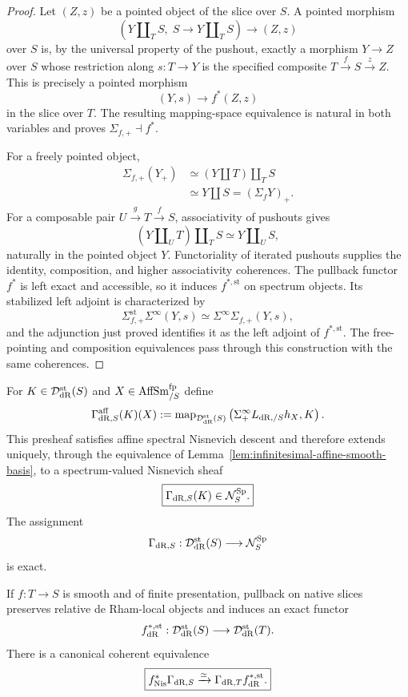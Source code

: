 \begin{proof}
Let $(Z,z)$ be a pointed object of the slice over $S$.  A pointed morphism
\[
    \left(Y\amalg_TS,\;S\to Y\amalg_TS\right)
    \longrightarrow
    (Z,z)
\]
over $S$ is, by the universal property of the pushout, exactly a morphism
$Y\to Z$ over $S$ whose restriction along $s:T\to Y$ is the specified
composite $T\xrightarrow{f}S\xrightarrow{z}Z$.  This is precisely a pointed
morphism
\[
    (Y,s)\longrightarrow f^*(Z,z)
\]
in the slice over $T$.  The resulting mapping-space equivalence is natural
in both variables and proves $\Sigma_{f,+}\dashv f^*$.

For a freely pointed object,
\[
\begin{aligned}
    \Sigma_{f,+}(Y_+)
    &\simeq
    (Y\amalg T)\amalg_T S\\
    &\simeq
    Y\amalg S
    =
    (\Sigma_fY)_+.
\end{aligned}
\]
For a composable pair $U\xrightarrow gT\xrightarrow fS$, associativity of
pushouts gives
\[
    (Y\amalg_UT)\amalg_TS
    \simeq
    Y\amalg_US,
\]
naturally in the pointed object $Y$.  Functoriality of iterated pushouts
supplies the identity, composition, and higher associativity coherences.
The pullback functor $f^*$ is left exact and accessible, so it induces
$f^{*,\mathrm{st}}$ on spectrum objects.  Its stabilized left adjoint is
characterized by
\[
    \Sigma_{f,+}^{\mathrm{st}}\Sigma^\infty(Y,s)
    \simeq
    \Sigma^\infty\Sigma_{f,+}(Y,s),
\]
and the adjunction just proved identifies it as the left adjoint of
$f^{*,\mathrm{st}}$.  The free-pointing and composition equivalences pass
through this construction with the same coherences.
\end{proof}

\begin{proposition}
\label{prop:infinitesimal-stable-dr-coefficient-sheaf}
For $K\in\mathcal D_{\mathrm{dR}}^{\mathrm{st}}(S)$ and
$X\in\operatorname{AffSm}^{\mathrm{fp}}_{/S}$ define
\[
    \Gamma_{\mathrm{dR},S}^{\mathrm{aff}}(K)(X)
    :=
    \operatorname{map}_{\mathcal D_{\mathrm{dR}}^{\mathrm{st}}(S)}
    \left(
      \Sigma^\infty_+L_{\mathrm{dR},/S}h_X,
      K
    \right).
\]
This presheaf satisfies affine spectral Nisnevich descent and therefore extends
uniquely, through the equivalence of
Lemma~\ref{lem:infinitesimal-affine-smooth-basis}, to a spectrum-valued
Nisnevich sheaf
\[
    \boxed{
    \Gamma_{\mathrm{dR},S}(K)\in\mathcal N_S^{\mathrm{Sp}}.
    }
\]
The assignment
\[
    \Gamma_{\mathrm{dR},S}:
    \mathcal D_{\mathrm{dR}}^{\mathrm{st}}(S)
    \longrightarrow
    \mathcal N_S^{\mathrm{Sp}}
\]
is exact.

If $f:T\to S$ is smooth and of finite presentation, pullback on native slices
preserves relative de Rham-local objects and induces an exact functor
\[
    f_{\mathrm{dR}}^{*,\mathrm{st}}:
    \mathcal D_{\mathrm{dR}}^{\mathrm{st}}(S)
    \longrightarrow
    \mathcal D_{\mathrm{dR}}^{\mathrm{st}}(T).
\]
There is a canonical coherent equivalence
\[
    \boxed{
    f^*_{\mathrm{Nis}}\Gamma_{\mathrm{dR},S}
    \xrightarrow{\simeq}
    \Gamma_{\mathrm{dR},T}f_{\mathrm{dR}}^{*,\mathrm{st}}.
    }
\]
\end{proposition}


